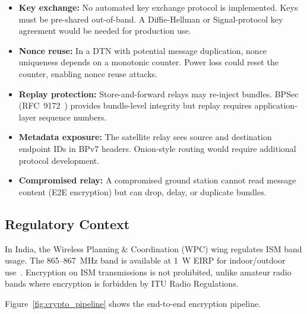 \documentclass[11pt,a4paper]{article}
\begin{document}
\begin{itemize}
    \item \textbf{Key exchange:} No automated key exchange protocol is implemented. Keys must be pre-shared out-of-band. A Diffie-Hellman or Signal-protocol key agreement would be needed for production use.
    \item \textbf{Nonce reuse:} In a DTN with potential message duplication, nonce uniqueness depends on a monotonic counter. Power loss could reset the counter, enabling nonce reuse attacks.
    \item \textbf{Replay protection:} Store-and-forward relays may re-inject bundles. BPSec (RFC~9172~\cite{rfc9172}) provides bundle-level integrity but replay requires application-layer sequence numbers.
    \item \textbf{Metadata exposure:} The satellite relay sees source and destination endpoint IDs in BPv7 headers. Onion-style routing would require additional protocol development.
    \item \textbf{Compromised relay:} A compromised ground station cannot read message content (E2E encryption) but can drop, delay, or duplicate bundles.
\end{itemize}

\subsection{Regulatory Context}

In India, the Wireless Planning \& Coordination (WPC) wing regulates ISM band usage. The 865--867~MHz band is available at 1~W EIRP for indoor/outdoor use~\cite{wpc_india}. Encryption on ISM transmissions is not prohibited, unlike amateur radio bands where encryption is forbidden by ITU Radio Regulations.

Figure~\ref{fig:crypto_pipeline} shows the end-to-end encryption pipeline.
\end{document}
